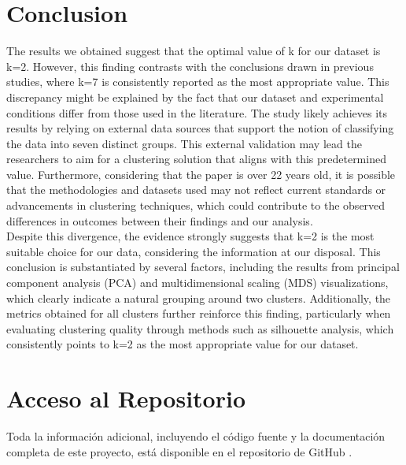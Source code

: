 \documentclass{article}
\begin{document}
\section{Conclusion}
The results we obtained suggest that the optimal value of k for our dataset is k=2. However, this finding contrasts with the conclusions drawn in previous studies, where k=7 is consistently reported as the most appropriate value. This discrepancy might be explained by the fact that our dataset and experimental conditions differ from those used in the literature. 
The study likely achieves its results by relying on external data sources that support the notion of classifying the data into seven distinct groups. This external validation may lead the researchers to aim for a clustering solution that aligns with this predetermined value. Furthermore, considering that the paper is over 22 years old, it is possible that the methodologies and datasets used may not reflect current standards or advancements in clustering techniques, which could contribute to the observed differences in outcomes between their findings and our analysis.
\\

Despite this divergence, the evidence strongly suggests that k=2 is the most suitable choice for our data, considering the information at our disposal. This conclusion is substantiated by several factors, including the results from principal component analysis (PCA) and multidimensional scaling (MDS) visualizations, which clearly indicate a natural grouping around two clusters. Additionally, the metrics obtained for all clusters further reinforce this finding, particularly when evaluating clustering quality through methods such as silhouette analysis, which consistently points to k=2 as the most appropriate value for our dataset.
\newpage
\section{Acceso al Repositorio}


Toda la información adicional, incluyendo el código fuente y la documentación completa de este proyecto, está disponible en el repositorio de GitHub \cite{silva2024github}.

\end{document}
